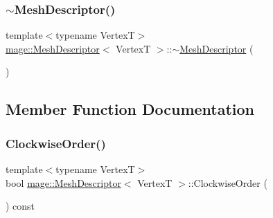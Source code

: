 \hypertarget{structmage_1_1_mesh_descriptor_adca32db164ab3032164c8dfe17af3db4}{}\label{structmage_1_1_mesh_descriptor_adca32db164ab3032164c8dfe17af3db4} 
\subsubsection{\texorpdfstring{$\sim$\+Mesh\+Descriptor()}{~MeshDescriptor()}}
{\footnotesize\ttfamily template$<$typename VertexT$>$ \\
\hyperlink{structmage_1_1_mesh_descriptor}{mage\+::\+Mesh\+Descriptor}$<$ VertexT $>$\+::$\sim$\hyperlink{structmage_1_1_mesh_descriptor}{Mesh\+Descriptor} (\begin{DoxyParamCaption}{ }\end{DoxyParamCaption})\hspace{0.3cm}{\ttfamily [default]}}



\subsection{Member Function Documentation}
\hypertarget{structmage_1_1_mesh_descriptor_ab81b000d93242ae002227010c4a9446c}{}\label{structmage_1_1_mesh_descriptor_ab81b000d93242ae002227010c4a9446c} 
\subsubsection{\texorpdfstring{Clockwise\+Order()}{ClockwiseOrder()}}
{\footnotesize\ttfamily template$<$typename VertexT$>$ \\
bool \hyperlink{structmage_1_1_mesh_descriptor}{mage\+::\+Mesh\+Descriptor}$<$ VertexT $>$\+::Clockwise\+Order (\begin{DoxyParamCaption}{ }\end{DoxyParamCaption}) const}

\hypertarget{structmage_1_1_mesh_descriptor_a7f63b926282683dcb0f674eca0901f5e}{}\label{structmage_1_1_mesh_descriptor_a7f63b926282683dcb0f674eca0901f5e} 
